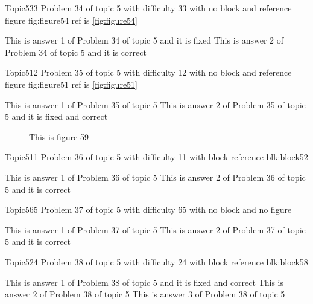\documentclass[master]{exam}
\begin{document}
\begin{problem}{Topic5}{33}
	Problem 34 of topic 5 with difficulty 33 with no block and reference figure fig:figure54 ref is \ref{fig:figure54}
	\begin{answers}
		\answer[fixed] This is answer 1 of Problem 34 of topic 5 and it is fixed
		\answer[correct] This is answer 2 of Problem 34 of topic 5 and it is correct
	\end{answers}
\end{problem}

\begin{problem}{Topic5}{12}
	Problem 35 of topic 5 with difficulty 12 with no block and reference figure fig:figure51 ref is \ref{fig:figure51}
	\begin{answers}
		\answer This is answer 1 of Problem 35 of topic 5 
		 This is answer 2 of Problem 35 of topic 5 and it is fixed and correct
	\end{answers}
\end{problem}



\begin{figure}
	\begin{center}
		This is figure 59 
		\label{fig:figure59}
	\end{center}
\end{figure}

\begin{problem}[requires=blk:block52]{Topic5}{11}
	Problem 36 of topic 5 with difficulty 11 with block reference blk:block52
	\begin{answers}
		\answer This is answer 1 of Problem 36 of topic 5 
		\answer[correct] This is answer 2 of Problem 36 of topic 5 and it is correct
	\end{answers}
\end{problem}

\begin{problem}{Topic5}{65}
	Problem 37 of topic 5 with difficulty 65 with no block and no figure
	\begin{answers}
		\answer This is answer 1 of Problem 37 of topic 5 
		\answer[correct] This is answer 2 of Problem 37 of topic 5 and it is correct
	\end{answers}
\end{problem}

\begin{problem}[requires=blk:block58]{Topic5}{24}
	Problem 38 of topic 5 with difficulty 24 with block reference blk:block58
	\begin{answers}
		 This is answer 1 of Problem 38 of topic 5 and it is fixed and correct
		\answer This is answer 2 of Problem 38 of topic 5 
		\answer This is answer 3 of Problem 38 of topic 5 
	\end{answers}
\end{problem}
\end{document}
